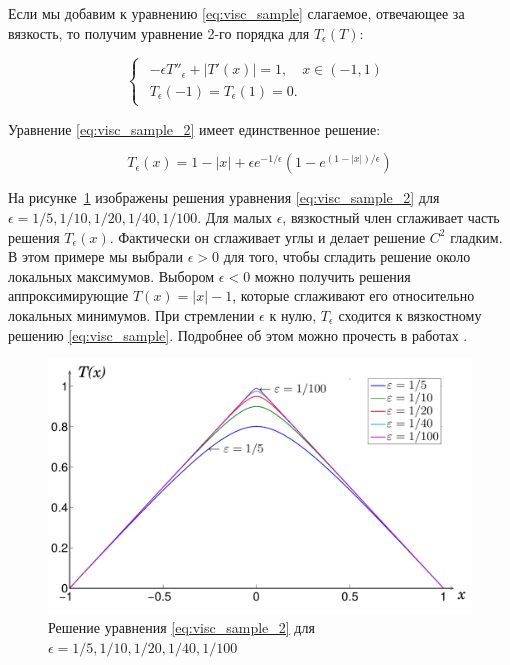 \documentclass[a4paper,12pt]{article}
\begin{document}
Если мы добавим к уравнению \eqref{eq:visc_sample} слагаемое,
отвечающее за вязкость, то получим уравнение 2-го порядка для
$T_\epsilon(T)$:

\begin{equation}
  \label{eq:visc_sample_2}
  \begin{cases}
    \begin{array}{ll}
      -\epsilon T''_\epsilon+|T'(x)| = 1,\quad x \in (-1,1) \\
      T_\epsilon(-1) = T_\epsilon(1) = 0.
    \end{array}
  \end{cases}
\end{equation}

Уравнение \eqref{eq:visc_sample_2} имеет единственное решение:

\begin{equation*}
  T_\epsilon(x) = 1 - |x| + \epsilon e^{-1/\epsilon}(1 - e^{(1-|x|)/\epsilon})
\end{equation*}


На рисунке~\ref{fig:viscosity-experiment} изображены решения уравнения
\eqref{eq:visc_sample_2} для $\epsilon =
1/5,1/10,1/20,1/40,1/100$. Для малых $\epsilon$, вязкостный член
сглаживает часть решения $T_\epsilon(x)$. Фактически он сглаживает
углы и делает решение $C^2$ гладким. В этом примере мы выбрали
$\epsilon >0$ для того, чтобы сгладить решение около локальных
максимумов. Выбором $\epsilon <0$ можно получить решения
аппроксимирующие $T(x) = |x| - 1$, которые сглаживают его относительно
локальных минимумов. При стремлении $\epsilon$ к нулю, $T_\epsilon$
сходится к вязкостному решению \eqref{eq:visc_sample}. Подробнее об
этом можно прочесть в работах \cite{V1984,V1983}.


\begin{figure}[h]
  \centering
  \includegraphics[width=0.6\linewidth]{img/viscosity_example.png}
  \hfil \caption{Решение уравнения \eqref{eq:visc_sample_2} 
	для $\epsilon = 1/5, 1/10, 1/20, 1/40, 1/100$}
  \label{fig:viscosity-experiment}

\end{figure}
\end{document}
